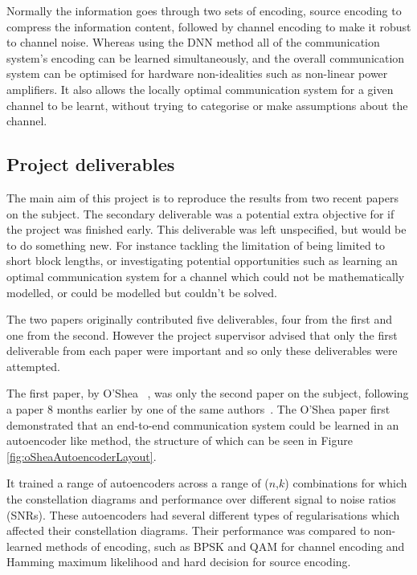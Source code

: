 \documentclass[12pt,onecolumn,letterpaper]{article}
\begin{document}
Normally the information goes through two sets of encoding, source encoding to compress the information content, followed by channel encoding to make it robust to channel noise. Whereas using the DNN method all of the communication system's encoding can be learned simultaneously, and the overall communication system can be optimised for hardware non-idealities such as non-linear power amplifiers. It also allows the locally optimal communication system for a given channel to be learnt, without trying to categorise or make assumptions about the channel.

\subsection{Project deliverables}

The main aim of this project is to reproduce the results from two recent papers ~\cite{oShea,Aoudia} on the subject. The secondary deliverable was a potential extra objective for if the project was finished early. This deliverable was left unspecified, but would be to do something new. For instance tackling the limitation of being limited to short block lengths, or investigating potential opportunities such as learning an optimal communication system for a channel which could not be mathematically modelled, or could be modelled but couldn't be solved.

The two papers originally contributed five deliverables, four from the first and one from the second. However the project supervisor advised that only the first deliverable from each paper were important and so only these deliverables were attempted. 

The first paper, by O'Shea \etal~\cite{oShea}, was only the second paper on the subject, following a paper 8 months earlier by one of the same authors~\cite{oShea0}. The O'Shea paper first demonstrated that an end-to-end communication system could be learned in an autoencoder like method, the structure of which can be seen in Figure \ref{fig:oSheaAutoencoderLayout}. 

It trained a range of autoencoders across a range of ($n$,$k$) combinations for which the constellation diagrams and performance over different signal to noise ratios (SNRs). These autoencoders had several different types of regularisations which affected their constellation diagrams. Their performance was compared to non-learned methods of encoding, such as BPSK and QAM for channel encoding and Hamming maximum likelihood and hard decision for source encoding. 
\end{document}
